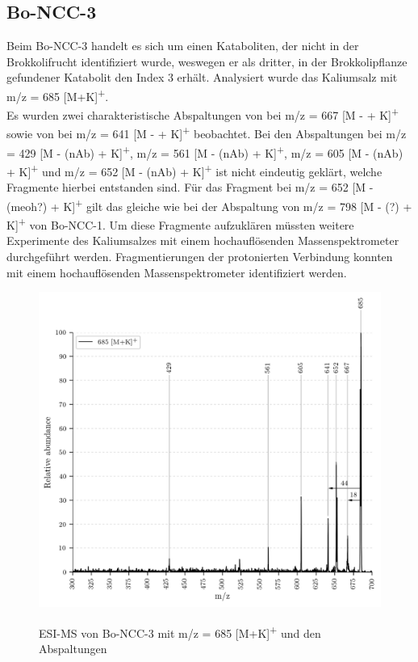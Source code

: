 \subsection{Bo-NCC-3}

Beim Bo-NCC-3 handelt es sich um einen Kataboliten, der nicht in der Brokkolifrucht identifiziert wurde, weswegen er als dritter, in der Brokkolipflanze gefundener Katabolit den Index 3 erhält. \cite{ChlorophyllCatabolitesBroccoli} Analysiert wurde das Kaliumsalz mit m/z = 685 [M+K]\textsuperscript{+}. \\

Es wurden zwei charakteristische Abspaltungen von  bei m/z = 667 [M -  + K]\textsuperscript{+} sowie von  bei m/z = 641 [M -  + K]\textsuperscript{+} beobachtet. Bei den Abspaltungen bei m/z = 429 [M - (\gls{nAb}) + K]\textsuperscript{+}, m/z = 561 [M - (\gls{nAb}) + K]\textsuperscript{+}, m/z = 605 [M - (\gls{nAb}) + K]\textsuperscript{+} und m/z = 652 [M - (\gls{nAb}) + K]\textsuperscript{+} ist nicht eindeutig geklärt, welche Fragmente hierbei entstanden sind. Für das Fragment bei m/z = 652 [M - (\gls{meoh}?) + K]\textsuperscript{+} gilt das gleiche wie bei der Abspaltung von m/z = 798 [M - (?) + K]\textsuperscript{+} von Bo-NCC-1. Um diese Fragmente aufzuklären müssten weitere Experimente des Kaliumsalzes mit einem hochauflösenden Massenspektrometer durchgeführt werden. Fragmentierungen der protonierten Verbindung konnten mit einem hochauflösenden Massenspektrometer identifiziert werden.

\begin{figure}[htbp]
  \includegraphics[width=\textwidth, height=0.7\textwidth]{figures/Kapitel4/Kataboliten/VWA_MS_LeafSpray_685.png}
  \label{fig:685MKLeafspray}
  
  \caption[ESI-MS von Bo-NCC-3, Quelle: Autor]{ESI-MS von Bo-NCC-3 mit m/z = 685 [M+K]\textsuperscript{+} und den Abspaltungen}
\end{figure}

